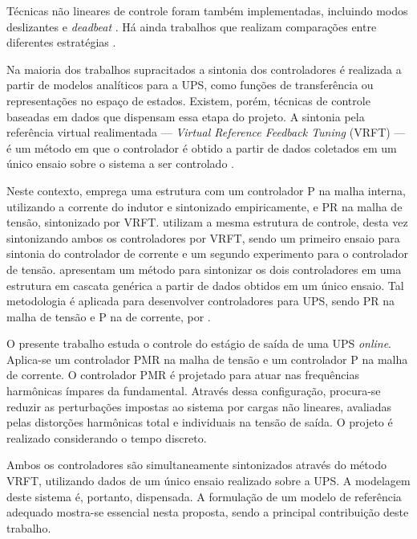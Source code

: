 \documentclass[repeatfields,oneside,overleaf]{tcc}
\begin{document}
Técnicas não lineares de controle foram também implementadas, incluindo modos deslizantes \cite{Utkin1993, Jung1996} e \textit{deadbeat} \cite{Park2003}.
Há ainda trabalhos que realizam comparações entre diferentes estratégias \cite{Timbus2009}.

Na maioria dos trabalhos supracitados a sintonia dos controladores é realizada a partir de modelos analíticos para a UPS, como funções de transferência ou representações no espaço de estados.
Existem, porém, técnicas de controle baseadas em dados que dispensam essa etapa do projeto.
A sintonia pela referência virtual realimentada --- \textit{Virtual Reference Feedback Tuning} (VRFT) --- é um método em que o controlador é obtido a partir de dados coletados em um único ensaio sobre o sistema a ser controlado \cite{Campi2000}.

Neste contexto, \textcite{Schildt2014} emprega uma estrutura com um controlador P na malha interna, utilizando a corrente do indutor e sintonizado empiricamente, e PR na malha de tensão, sintonizado por VRFT.
\textcite{Corleta2015, Corleta2016} utilizam a mesma estrutura de controle, desta vez sintonizando ambos os controladores por VRFT, sendo um primeiro ensaio para sintonia do controlador de corrente e um segundo experimento para o controlador de tensão.
%
\textcite{Chrystian2020} apresentam um método para sintonizar os dois controladores em uma estrutura em cascata genérica a partir de dados obtidos em um único ensaio.
Tal metodologia é aplicada para desenvolver controladores para UPS, sendo PR na malha de tensão e P na de corrente, por \textcite{Bruna2020}.

O presente trabalho estuda o controle do estágio de saída de uma UPS \textit{online}.
Aplica-se um controlador PMR na malha de tensão e um controlador P na malha de corrente.
O controlador PMR é projetado para atuar nas frequências harmônicas ímpares da fundamental.
Através dessa configuração, procura-se reduzir as perturbações impostas ao sistema por cargas não lineares, avaliadas pelas distorções harmônicas total e individuais na tensão de saída.
O projeto é realizado considerando o tempo discreto.

\newpage
Ambos os controladores são simultaneamente sintonizados através do método VRFT, utilizando dados de um único ensaio realizado sobre a UPS.
A modelagem deste sistema é, portanto, dispensada.
A formulação de um modelo de referência adequado mostra-se essencial nesta proposta, sendo a principal contribuição deste trabalho.
\end{document}
